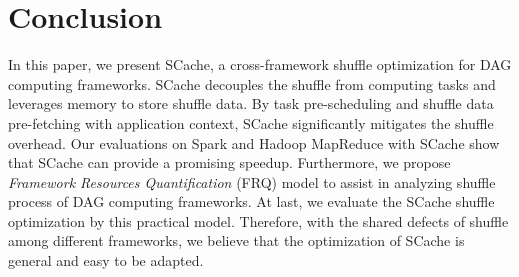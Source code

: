 \section{Conclusion}
In this paper, we present SCache, a cross-framework shuffle optimization for DAG computing frameworks. 
SCache decouples the shuffle from computing tasks and leverages memory to store shuffle data. 
By task pre-scheduling and shuffle data pre-fetching with application context, SCache significantly mitigates the shuffle overhead. 
{\color{blue}
Our evaluations on Spark and Hadoop MapReduce with SCache show that SCache can provide a promising speedup. 
Furthermore, we propose \textit{Framework Resources Quantification} (FRQ) model to assist in analyzing shuffle process of DAG computing frameworks. At last, we evaluate the SCache shuffle optimization by this practical model.
Therefore, with the shared defects of shuffle among different frameworks, we believe that the optimization of SCache is general and easy to be adapted. 
}
